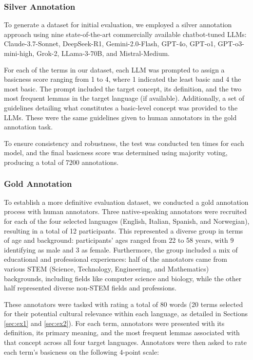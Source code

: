 \documentclass[preprint,12pt,authoryear]{elsarticle}
\begin{document}
\subsubsection{Silver Annotation}

To generate a dataset for initial evaluation, we employed a silver annotation approach using nine state-of-the-art commercially available chatbot-tuned LLMs: Claude-3.7-Sonnet, DeepSeek-R1, Gemini-2.0-Flash, GPT-4o, GPT-o1, GPT-o3-mini-high, Grok-2, LLama-3-70B, and Mistral-Medium.

For each of the terms in our dataset, each LLM was prompted to assign a basicness score ranging from 1 to 4, where 1 indicated the least basic and 4 the most basic. The prompt included the target concept, its definition, and the two most frequent lemmas in the target language (if available). Additionally, a set of guidelines detailing what constitutes a basic-level concept was provided to the LLMs. These were the same guidelines given to human annotators in the gold annotation task.

To ensure consistency and robustness, the test was conducted ten times for each model, and the final basicness score was determined using majority voting, producing a total of 7200 annotations.

\subsubsection{Gold Annotation}

To establish a more definitive evaluation dataset, we conducted a gold annotation process with human annotators. Three native-speaking annotators were recruited for each of the four selected languages (English, Italian, Spanish, and Norwegian), resulting in a total of 12 participants. This represented a diverse group in terms of age and background: participants' ages ranged from 22 to 58 years, with 9 identifying as male and 3 as female. Furthermore, the group included a mix of educational and professional experiences: half of the annotators came from various STEM (Science, Technology, Engineering, and Mathematics) backgrounds, including fields like computer science and biology, while the other half represented diverse non-STEM fields and professions.

These annotators were tasked with rating a total of 80 words (20 terms selected for their potential cultural relevance within each language, as detailed in Sections \ref{sec:ex1} and \ref{sec:ex2}). For each term, annotators were presented with its definition, its primary meaning, and the most frequent lemmas associated with that concept across all four target languages. Annotators were then asked to rate each term's basicness on the following 4-point scale:
\end{document}
